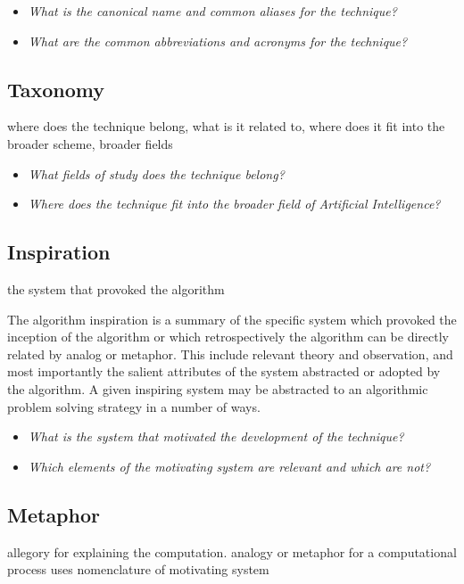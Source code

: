 \documentclass[a4paper, 11pt]{article}
\begin{document}
\begin{itemize}
	\item \emph{What is the canonical name and common aliases for the technique?}
	\item \emph{What are the common abbreviations and acronyms for the technique?}
\end{itemize}

\subsection{Taxonomy}
where does the technique belong, what is it related to, where does it fit into the broader scheme, broader fields

\begin{itemize}
	\item \emph{What fields of study does the technique belong?}
	\item \emph{Where does the technique fit into the broader field of Artificial Intelligence?}
\end{itemize}

\subsection{Inspiration}
the system that provoked the algorithm

The algorithm inspiration is a summary of the specific system which provoked the inception of the algorithm or which retrospectively the algorithm can be directly related by analog or metaphor. This include relevant theory and observation, and most importantly the salient attributes of the system abstracted or adopted by the algorithm. A given inspiring system may be abstracted to an algorithmic problem solving strategy in a number of ways.

\begin{itemize}
	\item \emph{What is the system that motivated the development of the technique?}
	\item \emph{Which elements of the motivating system are relevant and which are not?}
\end{itemize}

\subsection{Metaphor}
allegory for explaining the computation. analogy or metaphor for a computational process
uses nomenclature of motivating system
\end{document}

